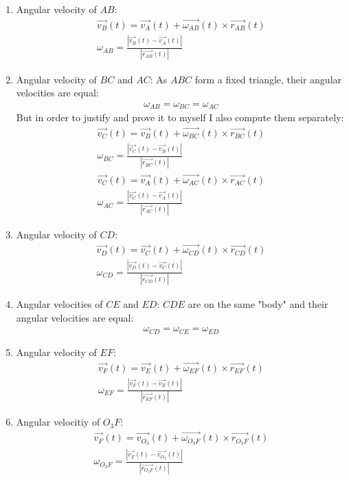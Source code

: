 \begin{enumerate}
    \item Angular velocity of $AB$:
          \begin{align}
              \vec{v_B}(t) = \vec{v_A}(t) + \vec{\omega_{AB}}(t) \times \vec{r_{AB}}(t) \\
              \omega_{AB} = \frac{|\vec{v_B}(t) - \vec{v_A}(t)|}{|\vec{r_{AB}}(t)|}
          \end{align}
    \item Angular velocity of $BC$ and $AC$:
          As $ABC$ form a fixed triangle, their angular velocities are equal:
          \begin{align}
              \omega_{AB} = \omega_{BC} = \omega_{AC}
          \end{align}
          But in order to justify and prove it to myself I also compute them separately:
          \begin{align}
              \vec{v_C}(t) = \vec{v_B}(t) + \vec{\omega_{BC}}(t) \times \vec{r_{BC}}(t) \\
              \omega_{BC} = \frac{|\vec{v_C}(t) - \vec{v_B}(t)|}{|\vec{r_{BC}}(t)|}
          \end{align}
          \begin{align}
              \vec{v_C}(t) = \vec{v_A}(t) + \vec{\omega_{AC}}(t) \times \vec{r_{AC}}(t) \\
              \omega_{AC} = \frac{|\vec{v_C}(t) - \vec{v_A}(t)|}{|\vec{r_{AC}}(t)|}
          \end{align}
    \item Angular velocity of $CD$:
          \begin{align}
              \vec{v_D}(t) = \vec{v_C}(t) + \vec{\omega_{CD}}(t) \times \vec{r_{CD}}(t) \\
              \omega_{CD} = \frac{|\vec{v_D}(t) - \vec{v_C}(t)|}{|\vec{r_{CD}}(t)|}
          \end{align}
    \item Angular velocities of $CE$ and $ED$:
          $CDE$ are on the same "body" and their angular velocities are equal:
          \begin{align}
              \omega_{CD} = \omega_{CE} = \omega_{ED}
          \end{align}
    \item Angular velocity of $EF$:
          \begin{align}
              \vec{v_F}(t) = \vec{v_E}(t) + \vec{\omega_{EF}}(t) \times \vec{r_{EF}}(t) \\
              \omega_{EF} = \frac{|\vec{v_F}(t) - \vec{v_E}(t)|}{|\vec{r_{EF}}(t)|}
          \end{align}
    \item Angular velocitiy of $O_3F$:
          \begin{align}
              \vec{v_F}(t) = \vec{v_{O_3}}(t) + \vec{\omega_{O_3F}}(t) \times \vec{r_{O_3F}}(t) \\
              \omega_{O_3F} = \frac{|\vec{v_F}(t) - \vec{v_{O_3}}(t)|}{|\vec{r_{O_3F}}(t)|}
          \end{align}
\end{enumerate}

